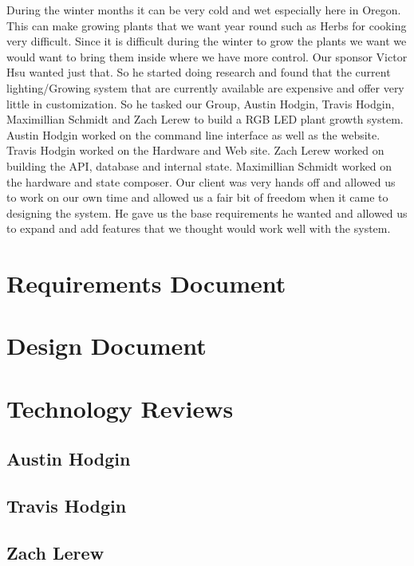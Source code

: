 \documentclass[onecolumn, draftclsnofoot,10pt, compsoc]{IEEEtran}
\begin{document}
	During the winter months it can be very cold and wet especially here in Oregon. This can make growing plants that we want year 
	round such as Herbs for cooking very difficult. Since it is difficult during the winter to grow the plants we want we would want
	to bring them inside where we have more control. Our sponsor Victor Hsu wanted just that. So he started doing research and found 
	that the current lighting/Growing system that are currently available are expensive and offer very little in customization. So he 
	tasked our Group, Austin Hodgin, Travis Hodgin, Maximillian Schmidt and Zach Lerew to build a RGB LED plant growth system. Austin Hodgin worked 
	on the command line interface as well as the website. Travis Hodgin worked on the Hardware and Web site. Zach Lerew worked on building the API, database
	and internal state. Maximillian Schmidt worked on the hardware and state composer. Our client was very hands off and allowed us to work on our own time 
	and allowed us a fair bit of freedom when it came to designing the system. He gave us the base requirements he wanted and allowed us to expand and add features
	that we thought would work well with the system. 



	

	\section{Requirements Document}
	
	\section{Design Document}
	

	\section{Technology Reviews}
		\subsection{Austin Hodgin}
		
		\subsection{Travis Hodgin}
		
		\subsection{Zach Lerew}
		
\end{document}
